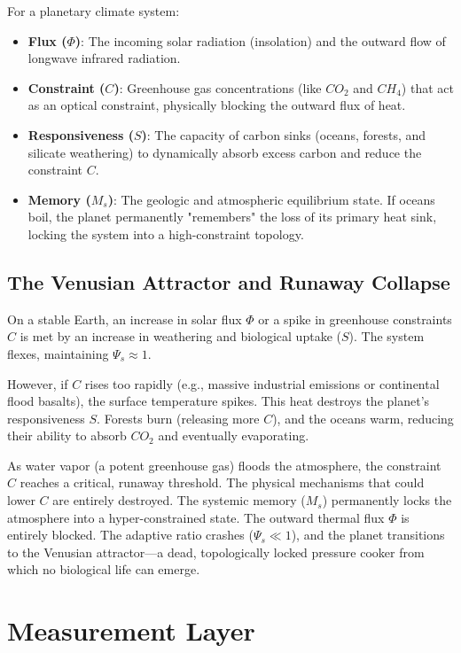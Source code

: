 \documentclass[11pt,a4paper]{article}
\begin{document}
For a planetary climate system:
\begin{itemize}
    \item \textbf{Flux ($\Phi$)}: The incoming solar radiation (insolation) and the outward flow of longwave infrared radiation.
    \item \textbf{Constraint ($C$)}: Greenhouse gas concentrations (like $CO_2$ and $CH_4$) that act as an optical constraint, physically blocking the outward flux of heat.
    \item \textbf{Responsiveness ($S$)}: The capacity of carbon sinks (oceans, forests, and silicate weathering) to dynamically absorb excess carbon and reduce the constraint $C$.
    \item \textbf{Memory ($M_s$)}: The geologic and atmospheric equilibrium state. If oceans boil, the planet permanently "remembers" the loss of its primary heat sink, locking the system into a high-constraint topology.
\end{itemize}

\subsection{The Venusian Attractor and Runaway Collapse}
On a stable Earth, an increase in solar flux $\Phi$ or a spike in greenhouse constraints $C$ is met by an increase in weathering and biological uptake ($S$). The system flexes, maintaining $\Psi_s \approx 1$.

However, if $C$ rises too rapidly (e.g., massive industrial emissions or continental flood basalts), the surface temperature spikes. This heat destroys the planet's responsiveness $S$. Forests burn (releasing more $C$), and the oceans warm, reducing their ability to absorb $CO_2$ and eventually evaporating.

As water vapor (a potent greenhouse gas) floods the atmosphere, the constraint $C$ reaches a critical, runaway threshold. The physical mechanisms that could lower $C$ are entirely destroyed. The systemic memory ($M_s$) permanently locks the atmosphere into a hyper-constrained state. The outward thermal flux $\Phi$ is entirely blocked. The adaptive ratio crashes ($\Psi_s \ll 1$), and the planet transitions to the Venusian attractor---a dead, topologically locked pressure cooker from which no biological life can emerge.



\section{Measurement Layer}
\end{document}
